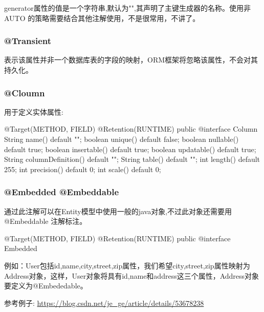 generator属性的值是一个字符串,默认为"",其声明了主键生成器的名称。使用非 AUTO 的策略需要结合其他注解使用，不是很常用，不讲了。

\subsubsection{@Transient}

表示该属性并非一个数据库表的字段的映射，ORM框架将忽略该属性，不会对其持久化。

\subsubsection{@Cloumn}

用于定义实体属性:

\begin{Java}
@Target({METHOD, FIELD}) 
@Retention(RUNTIME)
public @interface Column {
    String name() default "";
    boolean unique() default false;
    boolean nullable() default true;
    boolean insertable() default true;
    boolean updatable() default true;
    String columnDefinition() default "";
    String table() default "";
    int length() default 255;
    int precision() default 0;
    int scale() default 0;
}
\end{Java}

\subsubsection{@Embedded @Embeddable}

通过此注解可以在Entity模型中使用一般的java对象,不过此对象还需要用 @Embeddable 注解标注。

\begin{Java}
@Target({METHOD, FIELD})
@Retention(RUNTIME)
public @interface Embedded { }
\end{Java}

例如：User包括id,name,city,street,zip属性，我们希望city,street,zip属性映射为Address对象，这样，User对象将具有id,name和address这三个属性，Address对象要定义为@Embededable。

参考例子: \url{https://blog.csdn.net/je_ge/article/details/53678238}

\newpage